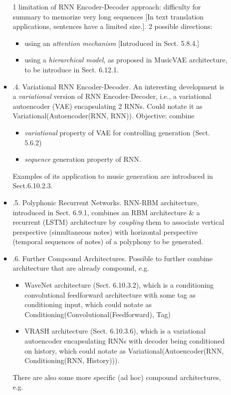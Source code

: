 \documentclass{article}
\begin{document}
\begin{itemize}
\begin{itemize}
\begin{itemize}
			1 limitation of RNN Encoder-Decoder approach: difficulty for summary to memorize very long sequences [In text translation applications, sentences have a limited size.]. 2 possible directions:
			\begin{itemize}
				\item using an {\it attention mechanism} [Introduced in Sect. 5.8.4.]
				\item using a {\it hierarchical model}, as proposed in MusicVAE architecture, to be introduce in Sect. 6.12.1.
			\end{itemize}
			\item {.4. Variational RNN Encoder-Decoder.} An interesting development is a {\it variational} version of RNN Encoder-Decoder, i.e., a variational autoencoder (VAE) encapsulating 2 RNNs. Could notate it as Variational(Autoencoder(RNN, RNN)). Objective: combine
			\begin{itemize}
				\item {\it variational} property of VAE for controlling generation (Sect. 5.6.2)
				\item {\it sequence} generation property of RNN.
			\end{itemize}
			Examples of its application to music generation are introduced in Sect.6.10.2.3.
			\item {.5. Polyphonic Recurrent Networks.} RNN-RBM architecture, introduced in Sect. 6.9.1, combines an RBM architecture \& a recurrent (LSTM) architecture by {\it coupling} them to associate vertical perspective (simultaneous notes) with horizontal perspective (temporal sequences of notes) of a polyphony to be generated.
			\item {.6. Further Compound Architectures.} Possible to further combine architecture that are already compound, e.g.
			\begin{itemize}
				\item WaveNet architecture (Sect. 6.10.3.2), which is a conditioning convolutional feedforward architecture with some tag as conditioning input, which could notate as Conditioning(Convolutional(Feedforward), Tag)
				\item VRASH architecture (Sect. 6.10.3.6), which is a variational autoencoder encapsulating RNNs with decoder being conditioned on history, which could notate as Variational(Autoencoder(RNN, Conditioning(RNN, History))).
			\end{itemize}
			There are also some more specific (ad hoc) compound architectures, e.g.
			\begin{itemize}

\end{itemize}
\end{itemize}
\end{itemize}
\end{itemize}
\end{document}
